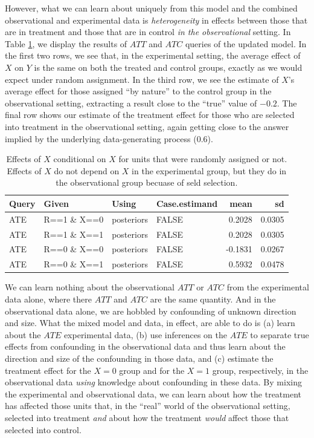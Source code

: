 \documentclass[
  12pt,
]{book}
\begin{document}
However, what we can learn about uniquely from this model and the combined observational and experimental data is \emph{heterogeneity} in effects between those that are in treatment and those that are in control \emph{in the observational} setting. In Table \ref{tab:combexpobsattatc}, we display the results of \(ATT\) and \(ATC\) queries of the updated model. In the first two rows, we see that, in the experimental setting, the average effect of \(X\) on \(Y\) is the same on both the treated and control groups, exactly as we would expect under random assignment. In the third row, we see the estimate of \(X\)'s average effect for those assigned ``by nature'' to the control group in the observational setting, extracting a result close to the ``true'' value of \(-0.2\). The final row shows our estimate of the treatment effect for those who are selected into treatment in the observational setting, again getting close to the answer implied by the underlying data-generating process (\(0.6\)).

\begin{table}

\caption{\label{tab:combexpobsattatc}Effects of $X$ conditional on $X$ for units that were randomly assigned or not.  Effects of $X$ do not depend on $X$ in the experimental group, but they do in the observational group becuase of seld selection. }
\centering
\begin{tabular}[t]{l|l|l|l|r|r}
\hline
Query & Given & Using & Case.estimand & mean & sd\\
\hline
ATE & R==1 \& X==0 & posteriors & FALSE & 0.2028 & 0.0305\\
\hline
ATE & R==1 \& X==1 & posteriors & FALSE & 0.2028 & 0.0305\\
\hline
ATE & R==0 \& X==0 & posteriors & FALSE & -0.1831 & 0.0267\\
\hline
ATE & R==0 \& X==1 & posteriors & FALSE & 0.5932 & 0.0478\\
\hline
\end{tabular}
\end{table}

We can learn nothing about the observational \(ATT\) or \(ATC\) from the experimental data alone, where there \(ATT\) and \(ATC\) are the same quantity. And in the observational data alone, we are hobbled by confounding of unknown direction and size. What the mixed model and data, in effect, are able to do is (a) learn about the \(ATE\) experimental data, (b) use inferences on the \(ATE\) to separate true effects from confounding in the observational data and thus learn about the direction and size of the confounding in those data, and (c) estimate the treatment effect for the \(X=0\) group and for the \(X=1\) group, respectively, in the observational data \emph{using} knowledge about confounding in these data. By mixing the experimental and observational data, we can learn about how the treatment has affected those units that, in the ``real'' world of the observational setting, selected into treatment \emph{and} about how the treatment \emph{would} affect those that selected into control.
\end{document}
